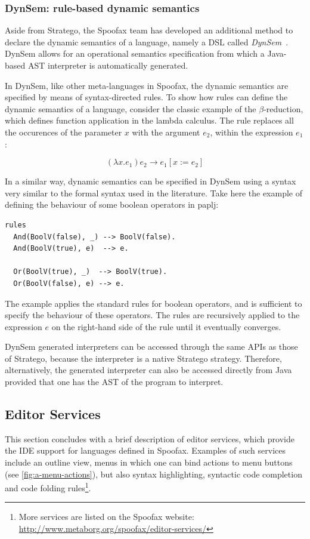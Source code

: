 \subsubsection{DynSem: rule-based dynamic semantics}
\label{ssec:a-dynsem}
Aside from Stratego, the Spoofax team has developed an additional
method to declare the dynamic semantics of a language, namely a DSL
called \emph{DynSem}~\cite{VerguNV15}. DynSem allows for an operational
semantics specification from which a Java-based AST interpreter is
automatically generated.

In DynSem, like other meta-languages in Spoofax, the dynamic semantics
are specified by means of syntax-directed rules. To show how rules can
define the dynamic semantics of a language, consider the classic
example of the \(\beta\)-reduction, which defines function application in
the lambda calculus. The rule replaces all the occurences of the
parameter \(x\) with the argument \(e_2\), within the expression \(e_1\):

\begin{equation}
(\lambda x.e_1) e_2 \rightarrow e_1[x := e_2]
\end{equation}

In a similar way, dynamic semantics can be specified in DynSem using a
syntax very similar to the formal syntax used in the literature. Take
here the example of defining the behaviour of some boolean operators
in paplj:
\lstset{language=dynsem,numbers=left}
\begin{lstlisting}
rules
  And(BoolV(false), _) --> BoolV(false).
  And(BoolV(true), e)  --> e.

  Or(BoolV(true), _)  --> BoolV(true).
  Or(BoolV(false), e) --> e.
\end{lstlisting}
The example applies the standard rules for boolean operators, and is
sufficient to specify the behaviour of these operators. The rules are
recursively applied to the expression \(e\) on the right-hand side of
the rule until it eventually converges.

DynSem generated interpreters can be accessed through the same APIs as
those of Stratego, because the interpreter is a native Stratego
strategy. Therefore, alternatively, the generated interpreter can also
be accessed directly from Java provided that one has the AST of the
program to interpret.

\lstset{numbers=none}

\subsection{Editor Services}
\label{ssec:a-editor-serv}
This section concludes with a brief description of editor services,
which provide the IDE support for languages defined in
Spoofax. Examples of such services include an outline view, menus in
which one can bind actions to menu buttons (see
\cref{fig:a-menu-actions}), but also syntax highlighting, syntactic code
completion and code folding rules\footnote{More services are
listed on the Spoofax website:
\url{http://www.metaborg.org/spoofax/editor-services/}}.

